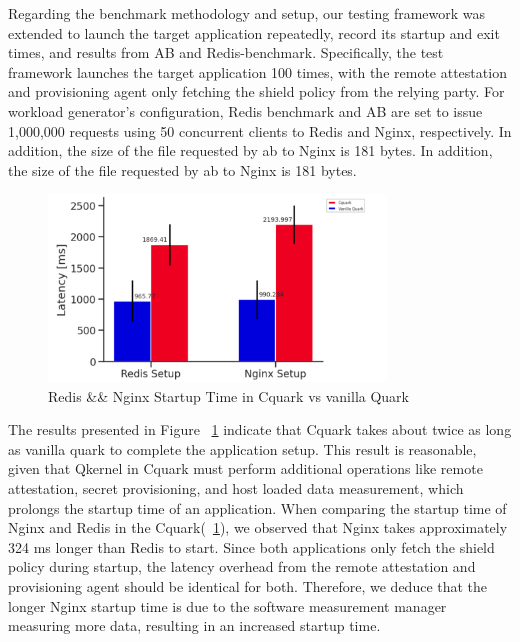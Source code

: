 Regarding the benchmark methodology and setup, our testing framework was extended to launch the target application repeatedly, record its startup and exit times, and results from AB and Redis-benchmark. Specifically, the test framework launches the target application 100 times, with the remote 
attestation and provisioning agent only fetching the shield policy from the relying party. For workload generator’s configuration, Redis benchmark and AB are set to issue 1,000,000 requests using 50 concurrent clients to Redis and Nginx, respectively. In addition, the size of the file requested 
by ab to Nginx is 181 bytes. In addition, the size of the file requested by ab to Nginx is 181 bytes.

\begin{figure}[H]
    \centering
    \includegraphics[width=0.8\textwidth]{images/reds_nginx_startup_comp.PNG}
    \caption[Redis \&\& Nginx Startup Time in Cquark vs vanilla Quark]{Redis \&\& Nginx Startup Time in Cquark vs vanilla Quark}
    \label{fig:reds_nginx_startup_comp}
\end{figure}

The results presented in Figure ~\ref{fig:reds_nginx_startup_comp} indicate that Cquark takes about twice as long as vanilla quark to complete the application setup. This result is reasonable, given that Qkernel in Cquark must perform additional operations like remote attestation, secret provisioning, and host loaded data 
measurement, which prolongs the startup time of an application. When comparing the startup time of Nginx and Redis in the Cquark(~\ref{fig:reds_nginx_startup_comp}), we observed that Nginx takes approximately  324 ms longer than Redis to start. Since both applications only fetch the shield policy 
during startup, the latency overhead from the remote attestation and provisioning agent should be identical for both. Therefore, we deduce that the longer Nginx startup time is due to the software measurement manager measuring more data, resulting in an increased startup time.

